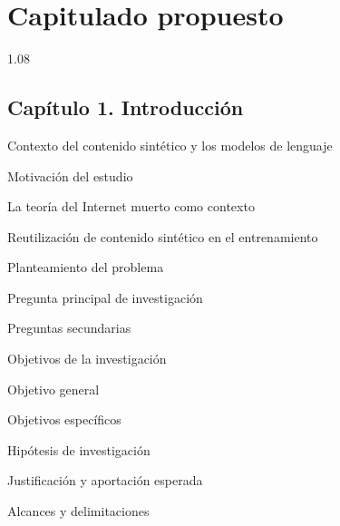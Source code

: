 \documentclass[12pt,letterpaper]{article}
\newcommand{\numerocap}{1}
\newcommand{\capitulo}[2]{\renewcommand{\numerocap}{#1}\Needspace{5\baselineskip}\subsection*{Capítulo #1. #2}}
\begin{document}
\section*{Capitulado propuesto}
\begin{spacing}{1.08}
\capitulo{1}{Introducción}
\begin{apartados}
\item Contexto del contenido sintético y los modelos de lenguaje
\item Motivación del estudio
\begin{apartados}
\item La teoría del Internet muerto como contexto
\item Reutilización de contenido sintético en el entrenamiento
\end{apartados}
\item Planteamiento del problema
\item Pregunta principal de investigación
\item Preguntas secundarias
\item Objetivos de la investigación
\begin{apartados}
\item Objetivo general
\item Objetivos específicos
\end{apartados}
\item Hipótesis de investigación
\item Justificación y aportación esperada
\item Alcances y delimitaciones
\end{apartados}


\end{spacing}
\end{document}
